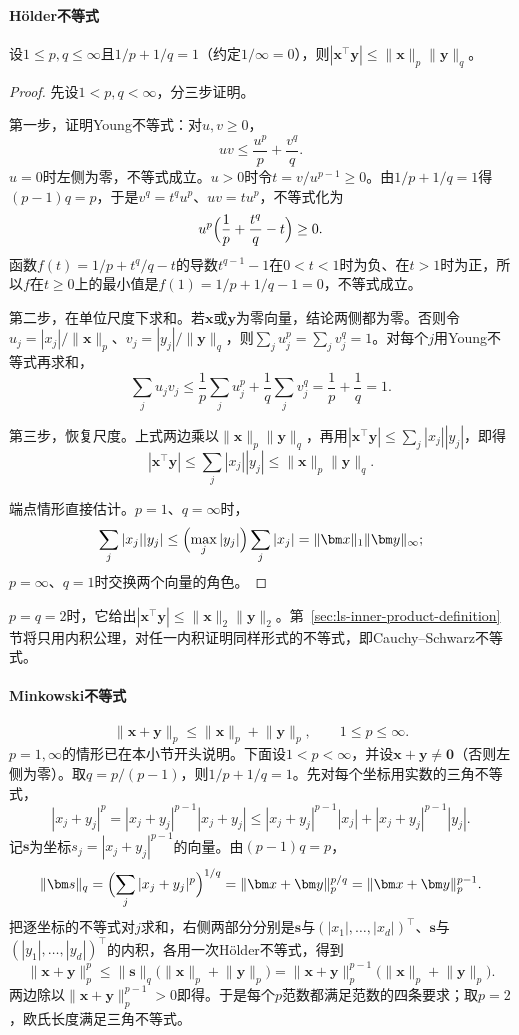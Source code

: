 \paragraph{Hölder不等式}
\begin{theorem}[有限维Hölder不等式]
\label{thm:linear-algebra-holder}
设$1\leq p,q\leq\infty$且$1/p+1/q=1$（约定$1/\infty=0$），则$|\bm x^\top\bm y|\leq\lVert\bm x\rVert_p\lVert\bm y\rVert_q$。
\end{theorem}
\begin{proof}
先设$1<p,q<\infty$，分三步证明。

第一步，证明Young不等式：对$u,v\geq0$，
\[
 uv\leq\frac{u^p}{p}+\frac{v^q}{q}.
\]
$u=0$时左侧为零，不等式成立。$u>0$时令$t=v/u^{p-1}\geq0$。由$1/p+1/q=1$得$(p-1)q=p$，于是$v^q=t^qu^p$、$uv=tu^p$，不等式化为
\[
 u^p\Bigl(\frac1p+\frac{t^q}{q}-t\Bigr)\geq0.
\]
函数$f(t)=1/p+t^q/q-t$的导数$t^{q-1}-1$在$0<t<1$时为负、在$t>1$时为正，所以$f$在$t\geq0$上的最小值是$f(1)=1/p+1/q-1=0$，不等式成立。

第二步，在单位尺度下求和。若$\bm x$或$\bm y$为零向量，结论两侧都为零。否则令$u_j=|x_j|/\lVert\bm x\rVert_p$、$v_j=|y_j|/\lVert\bm y\rVert_q$，则$\sum_ju_j^p=\sum_jv_j^q=1$。对每个$j$用Young不等式再求和，
\[
 \sum_ju_jv_j\leq\frac1p\sum_ju_j^p+\frac1q\sum_jv_j^q=\frac1p+\frac1q=1.
\]

第三步，恢复尺度。上式两边乘以$\lVert\bm x\rVert_p\lVert\bm y\rVert_q$，再用$|\bm x^\top\bm y|\leq\sum_j|x_j||y_j|$，即得
\[
 |\bm x^\top\bm y|\leq\sum_j|x_j||y_j|\leq\lVert\bm x\rVert_p\lVert\bm y\rVert_q.
\]

端点情形直接估计。$p=1$、$q=\infty$时，
\[
 \sum_j|x_j||y_j|\leq\Bigl(\max_j|y_j|\Bigr)\sum_j|x_j|=\lVert\bm x\rVert_1\lVert\bm y\rVert_\infty;
\]
$p=\infty$、$q=1$时交换两个向量的角色。
\end{proof}
$p=q=2$时，它给出$|\bm x^\top\bm y|\leq\lVert\bm x\rVert_2\lVert\bm y\rVert_2$。第~\ref{sec:ls-inner-product-definition}节将只用内积公理，对任一内积证明同样形式的不等式，即Cauchy--Schwarz不等式。

\paragraph{Minkowski不等式}
\[
 \lVert\bm x+\bm y\rVert_p\leq\lVert\bm x\rVert_p+\lVert\bm y\rVert_p,\qquad1\leq p\leq\infty.
\]
$p=1,\infty$的情形已在本小节开头说明。下面设$1<p<\infty$，并设$\bm x+\bm y\neq\bm0$（否则左侧为零）。取$q=p/(p-1)$，则$1/p+1/q=1$。先对每个坐标用实数的三角不等式，
\[
 |x_j+y_j|^p=|x_j+y_j|^{p-1}|x_j+y_j|\leq|x_j+y_j|^{p-1}|x_j|+|x_j+y_j|^{p-1}|y_j|.
\]
记$\bm s$为坐标$s_j=|x_j+y_j|^{p-1}$的向量。由$(p-1)q=p$，
\[
 \lVert\bm s\rVert_q=\Bigl(\sum_j|x_j+y_j|^{p}\Bigr)^{1/q}=\lVert\bm x+\bm y\rVert_p^{p/q}=\lVert\bm x+\bm y\rVert_p^{p-1}.
\]
把逐坐标的不等式对$j$求和，右侧两部分分别是$\bm s$与$(|x_1|,\ldots,|x_d|)^\top$、$\bm s$与$(|y_1|,\ldots,|y_d|)^\top$的内积，各用一次Hölder不等式，得到
\[
 \lVert\bm x+\bm y\rVert_p^p\leq\lVert\bm s\rVert_q\bigl(\lVert\bm x\rVert_p+\lVert\bm y\rVert_p\bigr)
 =\lVert\bm x+\bm y\rVert_p^{p-1}\bigl(\lVert\bm x\rVert_p+\lVert\bm y\rVert_p\bigr).
\]
两边除以$\lVert\bm x+\bm y\rVert_p^{p-1}>0$即得。于是每个$p$范数都满足范数的四条要求；取$p=2$，欧氏长度满足三角不等式。

